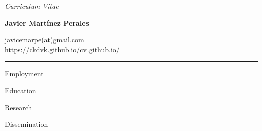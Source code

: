 \documentclass{style_classes/cv_new_academic}
\begin{document}
 
\begin{center}
            \textit{Curriculum Vitae}\\
            {\Large \textbf{Javier Mart\'inez Perales}\par}
            \href{javicemarpe@gmail.com}{javicemarpe(at)gmail.com}\\
            \href{https://ckdvk.github.io/cv.github.io/}{https://ckdvk.github.io/cv.github.io/}
        \end{center}
        \vspace{-0.15in}
        \rule{\textwidth}{1pt}
        \vspace{0.05in}

 
 


  
        \begin{Section}
            {Employment}
          \end{Section}

          
        

 



  \begin{Section}
    {Education}
  \end{Section}
 
  
 


 \newpage 

\begin{Section}
    {Research} 
  \end{Section}
 

 

 \begin{Section}
    {Dissemination} 
  \end{Section}
\end{document}
